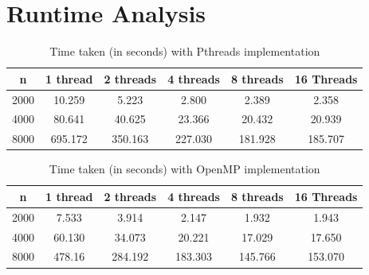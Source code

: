 \documentclass{article}
\begin{document}
\clearpage

\section{Runtime Analysis}


\begin{table}[!htb]
	\centering
	\begin{tabular}{cccccc}
		\hline
		\multicolumn{1}{|c|}{n} & \multicolumn{1}{c|}{1 thread} & \multicolumn{1}{c|}{2 threads} & \multicolumn{1}{c|}{4 threads} & \multicolumn{1}{c|}{8 threads} & \multicolumn{1}{c|}{16 Threads} \\ \hline
		2000                    & 10.259                        & 5.223                          & 2.800                          & 2.389                          & 2.358                           \\
		4000                    & 80.641                        & 40.625                         & 23.366                         & 20.432                         & 20.939                          \\
		8000                    & 695.172                       & 350.163                        & 227.030                        & 181.928                        & 185.707                        
	\end{tabular}
	\caption{Time taken (in seconds) with Pthreads implementation}
	\label{pthreads_time_taken}
\end{table}

\begin{table}[!htb]
	\centering
	\begin{tabular}{cccccc}
		\hline
		\multicolumn{1}{|c|}{n} & \multicolumn{1}{c|}{1 thread} & \multicolumn{1}{c|}{2 threads} & \multicolumn{1}{c|}{4 threads} & \multicolumn{1}{c|}{8 threads} & \multicolumn{1}{c|}{16 Threads} \\ \hline
		2000                    & 7.533                         & 3.914                          & 2.147                          & 1.932                          & 1.943                           \\
		4000                    & 60.130                        & 34.073                         & 20.221                         & 17.029                         & 17.650                          \\
		8000                    & 478.16                        & 284.192                        & 183.303                        & 145.766                        & 153.070                        
	\end{tabular}
	\caption{Time taken (in seconds) with OpenMP implementation}
	\label{omp_time_taken}
\end{table}
\end{document}
